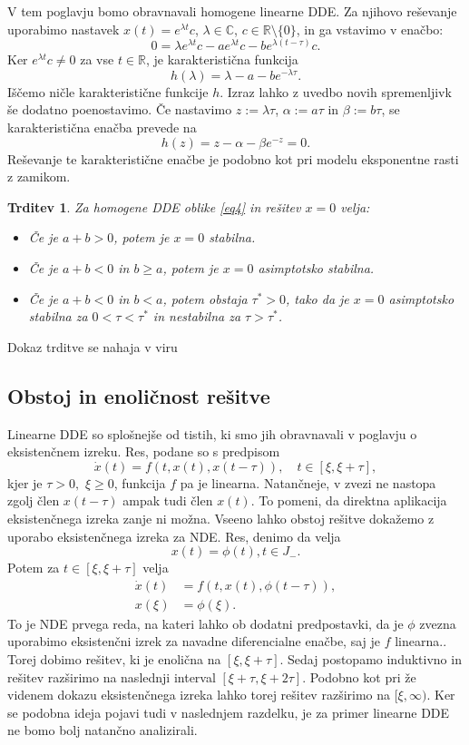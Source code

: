 \documentclass[12pt,a4paper]{amsart}
\theoremstyle{definition} %
\theoremstyle{plain} %
\newtheorem{trditev}[definicija]{Trditev}
\newcommand{\R}{\mathbb R}
\newcommand{\C}{\mathbb C}
\begin{document}
V tem poglavju bomo obravnavali homogene linearne DDE. Za njihovo reševanje uporabimo nastavek
$x(t)=e^{\lambda t}c$, $\lambda \in\C$, $c\in\R\setminus\{0\}$, in ga vstavimo v enačbo:
\begin{equation*}
        0 = \lambda e^{\lambda t}c - ae^{\lambda t}c -be^{\lambda(t-\tau)}c.   
\end{equation*}
Ker $e^{\lambda t}c \neq0$ za vse $t\in\R$, je karakteristična funkcija
\[h(\lambda)=\lambda-a-be^{-\lambda\tau}.\]
Iščemo ničle karakteristične funkcije $h$. Izraz lahko z uvedbo novih spremenljivk še dodatno 
poenostavimo. Če nastavimo $z:=\lambda\tau$, $\alpha:=a\tau$ in $\beta:=b\tau$, se karakteristična
enačba prevede na
\[h(z)=z-\alpha-\beta e^{-z}=0.\]
Reševanje te karakteristične enačbe je podobno kot pri modelu eksponentne rasti z zamikom.
\begin{trditev}
    Za homogene DDE oblike \eqref{eq4} in rešitev $x=0$ velja:
    \begin{itemize}
        \item Če je $a+b>0$, potem je $x=0$ stabilna.
        \item Če je $a+b<0$ in $b\geq a$, potem je $x=0$ asimptotsko stabilna.
        \item Če je $a+b<0$ in $b<a$, potem obstaja $\tau^{*}>0$, tako da je $x=0$ 
        asimptotsko stabilna za $0<\tau<\tau^{*}$ in nestabilna za $\tau>\tau^{*}$.
    \end{itemize}
\end{trditev}
\noindent Dokaz trditve se nahaja v viru \cite{envir}

\subsection{Obstoj in enoličnost rešitve}
Linearne DDE so splošnejše od tistih, ki smo jih obravnavali v poglavju o eksistenčnem izreku.
Res, podane so s predpisom
\[\dot{x}(t)=f(t,x(t),x(t-\tau)), \quad t\in[\xi,\xi+\tau],\]
kjer je $\tau>0,$ $\xi\geq 0$, funkcija $f$ pa je linearna. Natančneje, v zvezi ne nastopa zgolj člen $x(t-\tau)$ ampak tudi člen $x(t)$. To pomeni, da direktna aplikacija eksistenčnega izreka zanje ni možna. Vseeno lahko obstoj rešitve dokažemo z uporabo eksistenčnega izreka za NDE. Res, denimo da velja
$$x(t)=\phi(t), t\in J_{-}.$$
Potem za $t\in[\xi,\xi+\tau]$ velja 
\begin{equation*}
    \begin{split}
        \dot{x}(t)&=f(t,x(t),\phi(t-\tau)), \\
        x(\xi) &= \phi(\xi).
    \end{split}
\end{equation*}
To je NDE prvega reda, na kateri lahko ob dodatni predpostavki, da je $\phi$ zvezna uporabimo eksistenčni izrek za navadne 
diferencialne enačbe, saj je $f$ linearna.. Torej dobimo rešitev, ki je enolična na $[\xi,\xi+\tau]$. Sedaj postopamo 
induktivno in rešitev razširimo na naslednji interval $[\xi+\tau,\xi+2\tau]$.
Podobno kot pri že videnem dokazu eksistenčnega izreka lahko torej rešitev razširimo na $[\xi,\infty)$.
Ker se podobna ideja pojavi tudi v naslednjem razdelku, je za primer linearne DDE ne bomo bolj natančno analizirali.
\end{document}
